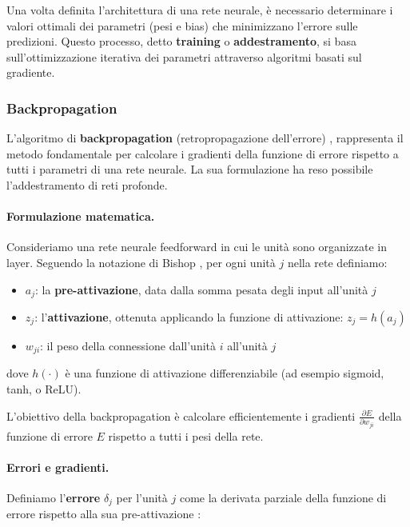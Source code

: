 Una volta definita l'architettura di una rete neurale, è necessario determinare i valori ottimali dei parametri (pesi e bias) che minimizzano l'errore sulle predizioni. Questo processo, detto \textbf{training} o \textbf{addestramento}, si basa sull'ot\-ti\-miz\-za\-zio\-ne iterativa dei parametri attraverso algoritmi basati sul gradiente. 

\subsubsection{Backpropagation}

L'algoritmo di \textbf{backpropagation} (retropropagazione dell'errore) \cite{rumelhart1986learning}, rappresenta il metodo fondamentale per calcolare i gradienti della funzione di errore rispetto a tutti i parametri di una rete neurale. La sua formulazione ha reso possibile l'addestramento di reti profonde.

\paragraph{Formulazione matematica.} Consideriamo una rete neurale feedforward in cui le unità sono organizzate in layer. Seguendo la notazione di Bishop \cite{bishop2006pattern}, per ogni unità $j$ nella rete definiamo:

\begin{itemize}
\item $a_j$: la \textbf{pre-attivazione}, data dalla somma pesata degli input all'unità $j$
\item $z_j$: l'\textbf{attivazione}, ottenuta applicando la funzione di attivazione: $z_j = h(a_j)$
\item $w_{ji}$: il peso della connessione dall'unità $i$ all'unità $j$
\end{itemize}

dove $h(\cdot)$ è una funzione di attivazione differenziabile (ad esempio sigmoid, tanh, o ReLU).

L'obiettivo della backpropagation è calcolare efficientemente i gradienti $\frac{\partial E}{\partial w_{ji}}$ della funzione di errore $E$ rispetto a tutti i pesi della rete. 

\paragraph{Errori e gradienti.} 
Definiamo l'\textbf{errore} $\delta_j$ per l'unità $j$ come la derivata parziale della funzione di errore rispetto alla sua pre-attivazione \cite{bishop2006pattern}:


